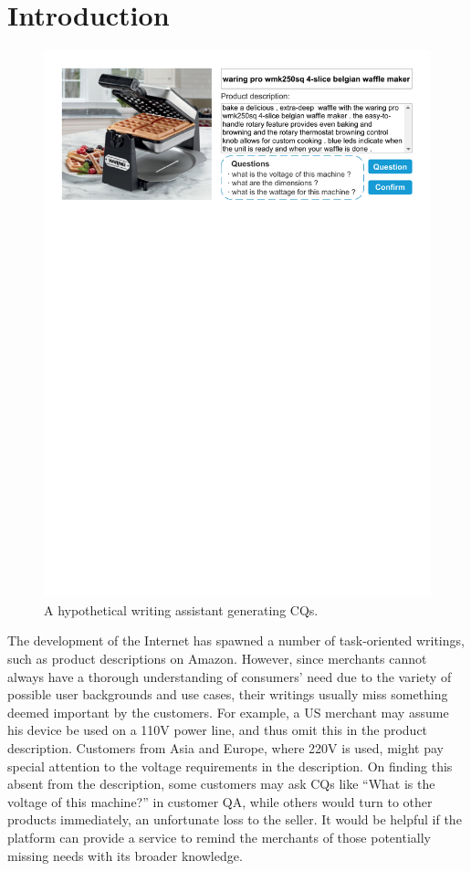 \section{Introduction}
\label{sec:intro}

\begin{figure}[htbp]
\centering
\includegraphics[width=\linewidth]{WA_UI.pdf}
\caption{A hypothetical writing assistant generating CQs.}
\label{fig:WA_UI}
\end{figure}
  
The development of the Internet has spawned a number of task-oriented writings, such as product descriptions on Amazon. However, since merchants cannot always have a thorough understanding of consumers' need due to the variety of possible user backgrounds and use cases, their writings usually miss something deemed important by the customers. For example, a US merchant may assume his device be 
used on a 110V power line, and thus omit this in the product description. 
Customers from Asia and Europe, where 220V is used, might pay special attention to the voltage 
requirements in the description. On finding this absent from the description, 
some customers may ask CQs like ``What is the voltage of this machine?'' in customer QA, while others would turn to other products immediately, an unfortunate loss to the seller. It would be helpful if the platform can provide a service to remind the merchants of those potentially missing needs with its broader knowledge.


